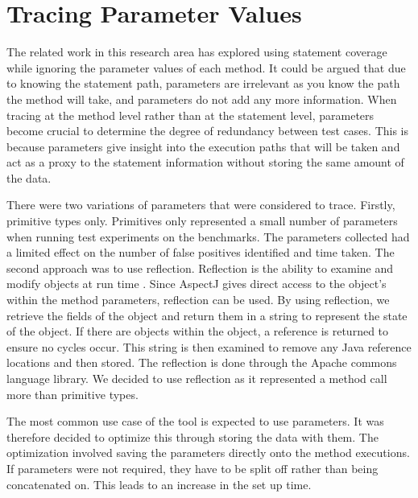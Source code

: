 \section{Tracing Parameter Values}
\label{parameterTrace}
The related work in this research area has explored using statement coverage while ignoring the parameter values of each method. It could be argued that due to knowing the statement path, parameters are irrelevant as you know the path the method will take, and parameters do not add any more information. When tracing at the method level rather than at the statement level, parameters become crucial to determine the degree of redundancy between test cases. This is because parameters give insight into the execution paths that will be taken and act as a proxy to the statement information without storing the same amount of the data.

There were two variations of parameters that were considered to trace. Firstly, primitive types only. Primitives only represented a small number of parameters when running test experiments on the benchmarks.  The parameters collected had a limited effect on the number of false positives identified and time taken. The second approach was to use reflection. Reflection is the ability to examine and modify objects at run time \cite{oraclereflection}. Since AspectJ gives direct access to the object's within the method parameters, reflection can be used. By using reflection, we retrieve the fields of the object and return them in a string to represent the state of the object. If there are objects within the object, a reference is returned to ensure no cycles occur. This string is then examined to remove any Java reference locations and then stored. The reflection is done through the Apache commons language library. We decided to use reflection as it represented a method call more than primitive types.

The most common use case of the tool is expected to use parameters. It was therefore decided to optimize this through storing the data with them. The optimization involved saving the parameters directly onto the method executions. If parameters were not required, they have to be split off rather than being concatenated on. This leads to an increase in the set up time.

